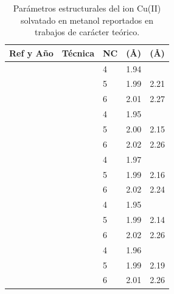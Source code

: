 \begin{table}[htbp]
    \centering
    \small
    \begin{threeparttable}
    \caption{Parámetros estructurales del ion Cu(II) solvatado en metanol reportados en trabajos de carácter teórico.}
    \label{tab:trabajos_teoricos_metanol}

    \begin{tabular}{| C{1.8cm} | C{6cm} | C{0.75cm} | C{2.5cm} | C{2.5cm} |}
        \hline
        \textbf{Ref y Año} & \textbf{Técnica} & \textbf{NC} & \textbf{ (\AA)} & \textbf{ (\AA)} \\ 
        \hline

         &  & 4 & 1.94 & \\ 
        & & 5 & 1.99 & 2.21 \\ 
        & & 6 & 2.01 & 2.27 \\ 
        \hline

         &  & 4 & 1.95 & \\ 
        & & 5 & 2.00 & 2.15 \\ 
        & & 6 & 2.02 & 2.26 \\ 
        \hline

         &  & 4 & 1.97 & \\ 
        & & 5 & 1.99 & 2.16 \\ 
        & & 6 & 2.02 & 2.24 \\ 
        \hline

         &  & 4 & 1.95 & \\ 
        & & 5 & 1.99 & 2.14 \\ 
        & & 6 & 2.02 & 2.26 \\ 
        &  & 4 & 1.96 & \\ 
        & & 5 & 1.99 & 2.19 \\ 
        & & 6 & 2.01 & 2.26 \\ 
        \hline
    \end{tabular}
    \end{threeparttable}
\end{table}

